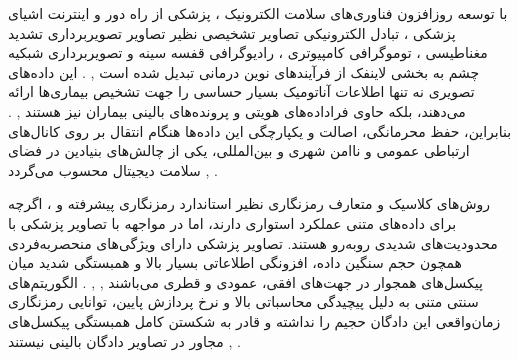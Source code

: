 




با توسعه روزافزون فناوری‌های سلامت الکترونیک ، پزشکی از راه دور  و اینترنت اشیای پزشکی ، تبادل الکترونیکی تصاویر تشخیصی نظیر تصاویر تصویربرداری تشدید مغناطیسی ، توموگرافی کامپیوتری ، رادیوگرافی قفسه سینه  و تصویربرداری شبکیه چشم به بخشی لاینفک از فرآیندهای نوین درمانی تبدیل شده است , . این داده‌های تصویری نه تنها اطلاعات آناتومیک بسیار حساسی را جهت تشخیص بیماری‌ها ارائه می‌دهند، بلکه حاوی فراداده‌های هویتی و پرونده‌های بالینی بیماران نیز هستند , . بنابراین، حفظ محرمانگی، اصالت و یکپارچگی این داده‌ها هنگام انتقال بر روی کانال‌های ارتباطی عمومی و ناامن شهری و بین‌المللی، یکی از چالش‌های بنیادین در فضای سلامت دیجیتال محسوب می‌گردد , .\par



روش‌های کلاسیک و متعارف رمزنگاری نظیر استاندارد رمزنگاری پیشرفته  و ، اگرچه برای داده‌های متنی عملکرد استواری دارند، اما در مواجهه با تصاویر پزشکی با محدودیت‌های شدیدی روبه‌رو هستند. تصاویر پزشکی دارای ویژگی‌های منحصربه‌فردی همچون حجم سنگین داده، افزونگی اطلاعاتی بسیار بالا و همبستگی شدید میان پیکسل‌های همجوار در جهت‌های افقی، عمودی و قطری می‌باشند , , . الگوریتم‌های سنتی متنی به دلیل پیچیدگی محاسباتی بالا و نرخ پردازش پایین، توانایی رمزنگاری زمان‌واقعی  این دادگان حجیم را نداشته و قادر به شکستن کامل همبستگی پیکسل‌های مجاور در تصاویر دادگان بالینی نیستند , .\par



